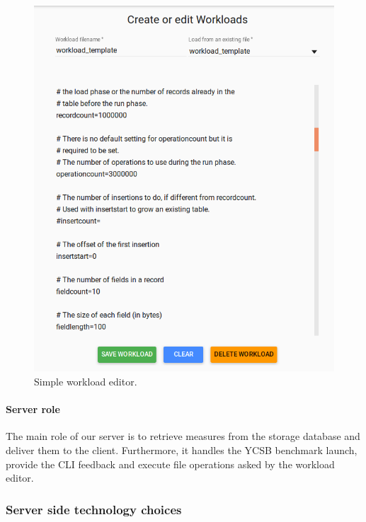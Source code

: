 \documentclass[a4paper,11pt]{report}
\begin{document}
\begin{figure}[ht]
\begin{center}
\includegraphics[width=1\linewidth]{images/workload_editor.png}
\caption{Simple workload editor.}
\label{workload_editor}
\end{center}
\end{figure}

\afterpage{\clearpage}

\paragraph{Server role}

The main role of our server is to retrieve measures from the storage database and deliver them to the client. Furthermore, it handles the YCSB benchmark launch, provide the CLI feedback and execute file operations asked by the workload editor. 

\subsubsection{Server side technology choices}
\end{document}
